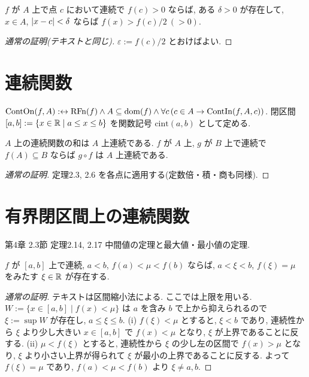 \begin{thm}
  $f$ が $A$ 上で点 $c$ において連続で $f(c) > 0$ ならば, ある $\delta > 0$ が存在して, $x \in A$, $\lvert x - c\rvert < \delta$ ならば $f(x) > f(c)/2\ (> 0)$.
\end{thm}
\begin{proof}[通常の証明(テキストと同じ)]
  $\varepsilon := f(c)/2$ とおけばよい.
\end{proof}

\section{連続関数}

\begin{dfn}[テキスト定義2.8]
  $\mathrm{ContOn}(f, A) :\leftrightarrow \mathrm{RFn}(f) \land A \subseteq \mathrm{dom}(f) \land \forall c\,(c \in A \to \mathrm{ContIn}(f, A, c))$. 閉区間 $[a, b] := \{x \in \mathbb{R} \mid a \leq x \leq b\}$ を関数記号 $\mathrm{cint}(a, b)$ として定める.
\end{dfn}

\begin{thm}[テキスト定理2.9, 2.10]
  $A$ 上の連続関数の和は $A$ 上連続である. $f$ が $A$ 上, $g$ が $B$ 上で連続で $f(A) \subseteq B$ ならば $g \circ f$ は $A$ 上連続である.
\end{thm}
\begin{proof}[通常の証明]
  定理2.3, 2.6 を各点に適用する(定数倍・積・商も同様).
\end{proof}

\section{有界閉区間上の連続関数}

\begin{textref}{第4章 2.3節 定理2.14, 2.17}
  中間値の定理と最大値・最小値の定理.
\end{textref}

\begin{thm}
  $f$ が $[a, b]$ 上で連続, $a < b$, $f(a) < \mu < f(b)$ ならば, $a < \xi < b$, $f(\xi) = \mu$ をみたす $\xi \in \mathbb{R}$ が存在する.
\end{thm}
\begin{proof}[通常の証明]
  テキストは区間縮小法による. ここでは上限を用いる. $W := \{x \in [a, b] \mid f(x) < \mu\}$ は $a$ を含み $b$ で上から抑えられるので $\xi := \sup W$ が存在し, $a \leq \xi \leq b$. (i) $f(\xi) < \mu$ とすると, $\xi < b$ であり, 連続性から $\xi$ より少し大きい $x \in [a, b]$ で $f(x) < \mu$ となり, $\xi$ が上界であることに反する. (ii) $\mu < f(\xi)$ とすると, 連続性から $\xi$ の少し左の区間で $f(x) > \mu$ となり, $\xi$ より小さい上界が得られて $\xi$ が最小の上界であることに反する. よって $f(\xi) = \mu$ であり, $f(a) < \mu < f(b)$ より $\xi \neq a, b$.
\end{proof}

